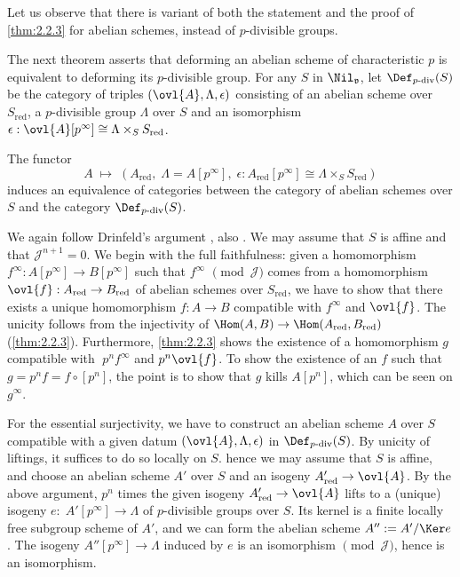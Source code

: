 Let us observe that there is variant of both the statement and the
proof of \ref{thm:2.2.3} for abelian schemes, instead of $p$-divisible groups. 

 The next theorem asserts that deforming an abelian scheme of
 characteristic 
 $p$ is equivalent to deforming its $p$-divisible group. For any $S $ in
 $\Nil_\mathfrak{v}$, let $\Def_{p\text{-div}}(S)$ be the category of
 triples $(\ovl{A},\Lambda, \epsilon)$ consisting of an abelian scheme
 over $S_{\mathrm{red}}$, a $p$-divisible group $\Lambda$ over $S$ and an
 isomorphism $\epsilon: \ovl{A}[p^\infty]\cong \Lambda\times_S S_{\mathrm{red}}$.

\begin{thm}\label{thm:2.2.4}
 The functor
 \begin{equation*}
  A\;\mapsto \;(A_{\mathrm{red}},\;\Lambda=A[p^\infty],
   \;\epsilon: A_{\mathrm{red}}[p^\infty]\cong \Lambda\times_S S_{\mathrm{red}})
 \end{equation*}
 induces an equivalence of categories between the
 category of abelian schemes over $S$ and the category
 $\Def_{p\text{-div}}(S)$.
\end{thm}


We again follow Drinfeld's argument \cite{copsr}, \cf also \cite{slm}.
We may assume that $S$ is affine and that
$\mathcal{J}^{n+1}=0$. We begin with the full faithfulness: given a
homomorphism $f^\infty: A[p^\infty]\rightarrow B[p^\infty]$ such that
$f^\infty$ $\pmod{\mathcal{J}}$ comes from a homomorphism $\ovl{f} :
A_{\mathrm{red}}\rightarrow B_{\mathrm{red}}$ of abelian schemes over $S_{\mathrm{red}}$, we have
to show that there exists a unique homomorphism $f: A\rightarrow B$
compatible with $f^\infty$ and $\ovl{f}$. The unicity follows from the
injectivity of $\Hom(A,B)\rightarrow \Hom(A_{\mathrm{red}},B_{\mathrm{red}})\;$
(\ref{thm:2.2.3}). Furthermore, \ref{thm:2.2.3} shows the existence of a
homomorphism $g$ 
compatible with $\;p^nf^\infty$ and $p^n\ovl{f}$. To show the existence
of an $f$ such that $g=p^nf=f\circ [p^n]$, the point is to show that $g$
kills $A[p^n]$, which can be seen on $g^\infty$.


For the essential surjectivity, we have to construct an abelian scheme
$A$ over $S$ compatible with a given datum $(\ovl{A},\Lambda, \epsilon)$
in $\Def_{p\text{-div}}(S)$.  By unicity of liftings, it suffices to do so
locally on $S$.  hence we may assume that $S$ is affine, and choose an
abelian scheme $A'$ over $S$ and an isogeny $A'_{\mathrm{red}}\rightarrow
\ovl{A}$. By the above argument, $p^n$ times the given isogeny
$A'_{\mathrm{red}}\rightarrow \ovl{A}$ lifts to a (unique) isogeny
$e:\;A'[p^\infty ]\rightarrow \Lambda$ of $p$-divisible groups over
$S$. Its kernel is a finite locally free subgroup scheme of $A'$, and we
can form the abelian scheme $A'':=A'/\Ker e$. The isogeny $A''[p^\infty
]\rightarrow \Lambda$ induced by $e$ is an isomorphism
$\pmod{\mathcal{J}}$, hence is an isomorphism.

